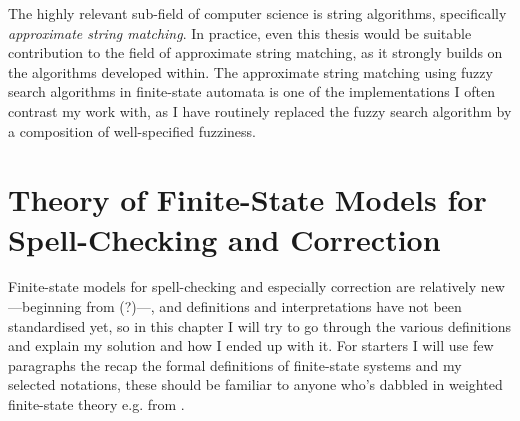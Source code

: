 \documentclass[officiallayout,draft]{unihelcompling}
\begin{document}
The highly relevant sub-field of computer science is string algorithms,
specifically \emph{approximate string matching}. In practice, even this
thesis would be suitable contribution to the field of approximate string
matching, as it strongly builds on the algorithms developed within. The
approximate string matching using fuzzy search algorithms in finite-state
automata is one of the implementations I often contrast my work with, as
I have routinely replaced the fuzzy search algorithm by a composition of
well-specified fuzziness.

\section{Theory of Finite-State Models for Spell-Checking and Correction}

Finite-state models for spell-checking and especially correction are relatively
new---beginning from \cite{oflazer1996errortolerant}(?)---, and definitions and
interpretations have not been standardised yet, so in this chapter I will try
to go through the various definitions and explain my solution and how I ended
up with it. For starters I will use few paragraphs the recap the formal
definitions of finite-state systems and my selected notations, these should be
familiar to anyone who's dabbled in weighted finite-state theory e.g. from
\cite{aho2007compilers,mohri1997finitestate}.
\end{document}
